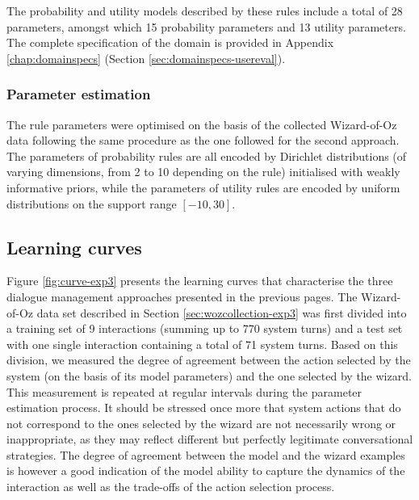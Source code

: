\begin{itemize}
\end{itemize}

The probability and utility models described by these rules include a total of 28 parameters, amongst which 15 probability parameters and 13 utility parameters.  The complete specification of the domain is provided in Appendix \ref{chap:domainspecs} (Section \ref{sec:domainspecs-usereval}). 

\subsubsection*{Parameter estimation}

The rule parameters were optimised on the basis of the collected Wizard-of-Oz data following the same procedure as the one followed for the second approach.  The parameters of probability rules are all encoded by Dirichlet distributions (of varying dimensions, from 2 to 10 depending on the rule) initialised with weakly informative priors, while the parameters of utility rules are encoded by uniform distributions on the support range $[-10, 30]$.  


\subsection{Learning curves}
\label{sec:learningcurve-exp3}

Figure \ref{fig:curve-exp3} presents the learning curves that characterise the three dialogue management approaches presented in the previous pages. The Wizard-of-Oz data set described in Section \ref{sec:wozcollection-exp3} was first divided into a training set of 9 interactions (summing up to 770 system turns) and a test set with one single interaction containing a total of 71 system turns. Based on this division, we measured the degree of agreement between the action selected by the system (on the basis of its model parameters) and the one selected by the wizard. This measurement is repeated at regular intervals during the parameter estimation process.  It should be stressed once more that system actions that do not correspond to the ones selected by the wizard are not necessarily wrong or inappropriate, as they may reflect different but perfectly legitimate conversational strategies. The degree of agreement between the model and the wizard examples is however a good indication of the model ability to capture the dynamics of the interaction as well as the trade-offs of the action selection process. 

